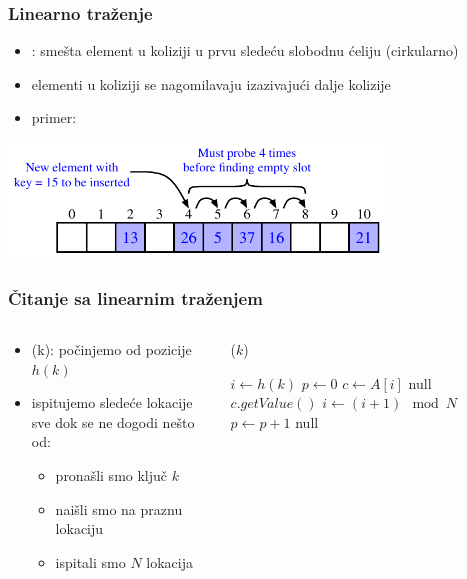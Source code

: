\documentclass[compress,aspectratio=169]{beamer}
\begin{document}
\begin{frame}[fragile]
  \frametitle{Linearno traženje}
  \begin{itemize}
    \item {}: smešta element u koliziji u prvu sledeću slobodnu ćeliju (cirkularno)
    \item elementi u koliziji se nagomilavaju izazivajući dalje kolizije
    \item primer:
  \end{itemize}
  \begin{center}
    \includegraphics[width=10cm]{asp-10-pic09.pdf}
  \end{center}
\end{frame}

\begin{frame}[fragile]
  \frametitle{Čitanje sa linearnim traženjem}
  \begin{columns}
    \begin{column}[c]{6cm}
      \begin{itemize}
        \item {}(k): počinjemo od pozicije $h(k)$
        \item ispitujemo sledeće lokacije sve dok se ne dogodi nešto od:
        \begin{itemize}
          \item pronašli smo ključ $k$
          \item naišli smo na praznu lokaciju
          \item ispitali smo $N$ lokacija
        \end{itemize}
      \end{itemize}
    \end{column}
    \begin{column}[c]{5cm}
      ($k$)
      \begin{algorithmic}
        \small
        \STATE $i \leftarrow h(k)$
        \STATE $p \leftarrow 0$
        \REPEAT
          \STATE $c \leftarrow A[i]$
            \RETURN null
          \ELSE 
              \RETURN $c.getValue()$
            \ELSE
              \STATE $i \leftarrow (i+1)\mod N$
              \STATE $p \leftarrow p+1$
            \ENDIF
          \ENDIF
        \RETURN null
      \end{algorithmic}
    \end{column}
  \end{columns}
\end{frame}
\end{document}
